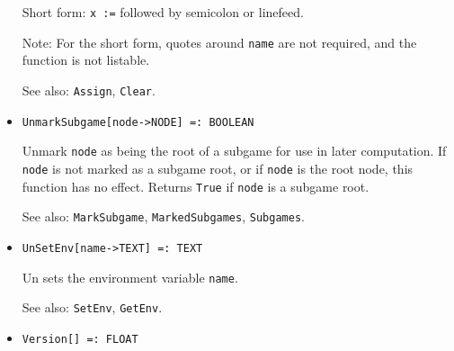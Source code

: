 \begin{itemize}
{\it for all types} {\tt T}
\bd
Undefines the variable with name \verb+name+.  Returns the
last value of the variable.
\item [Short form:] \verb+x :=+ followed by semicolon or linefeed. 
\item [Note:] For the short form, quotes around \verb+name+ are not
required, and the function is not listable.
\item [See also:] \verb+Assign+, \verb+Clear+.
\ed

\item{}
\protect \large \begin{verbatim}
UnmarkSubgame[node->NODE] =: BOOLEAN
\end{verbatim}\normalsize

\bd
Unmark \verb+node+ as being the root of a subgame for use in later
computation.  If \verb+node+ is not marked as a subgame root, or if
\verb+node+ is the root node, this function has no effect.  Returns
\verb+True+ if \verb+node+ is a subgame root.
\item [See also:] \verb+MarkSubgame+, \verb+MarkedSubgames+,
\verb+Subgames+.
\ed



\item{}
\protect \large \begin{verbatim}
UnSetEnv[name->TEXT] =: TEXT
\end{verbatim} \normalsize

\bd
Un sets the environment variable \verb+name+.
\item [See also:] \verb+SetEnv+, \verb+GetEnv+.
\ed


\item{}
\protect \large \begin{verbatim}
Version[] =: FLOAT
\end{verbatim} \normalsize


\end{itemize}
